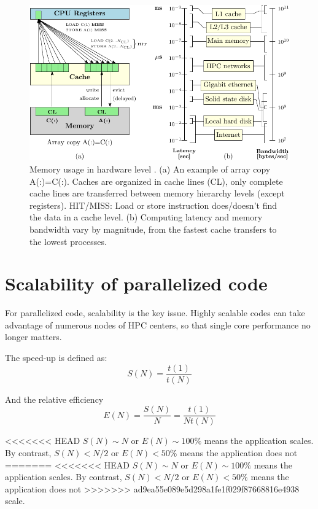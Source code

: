 \begin{figure}[h]
\begin{centering}
\includegraphics{_figure/memory}
\par\end{centering}

\caption[Memory usage in hardware level]{Memory usage in hardware level \citep{LRZ-cours}. (a) An example
of array copy A(:)=C(:). Caches are organized in cache lines (CL),
only complete cache lines are transferred between memory hierarchy
levels (except registers). HIT/MISS: Load or store instruction does/doesn't
find the data in a cache level. (b) Computing latency and memory bandwidth
vary by magnitude, from the fastest cache transfers to the lowest
processes.\label{fig:Memory}}
\end{figure}



\section{Scalability of parallelized code}

For parallelized code, scalability is the key issue. Highly scalable
codes can take advantage of numerous nodes of HPC centers, so that
single core performance no longer matters. 

The speed-up is defined as:
\begin{equation}
S(N)=\dfrac{t(1)}{t(N)}
\end{equation}


And the relative efficiency
\begin{equation}
E(N)=\dfrac{S(N)}{N}=\dfrac{t(1)}{Nt(N)}
\end{equation}


<<<<<<< HEAD
$S(N)\sim N$ or $E(N)\sim100\%$ means the application scales. By
contrast, $S(N)<N/2$ or $E(N)<50\%$ means the application does not
=======
<<<<<<< HEAD
$S(N)\sim N$ or $E(N)\sim100\%$ means the application scales. 
By contrast, $S(N)<N/2$ or $E(N)<50\%$ means the application does not
>>>>>>> ad9ea55e089e5d298a1fe1f029f87668816e4938
scale. 

